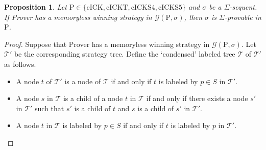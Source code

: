\documentclass{myifcolog}
\newcommand{\hickp}{\mathrm{P}}
\newcommand{\cick}{\mathrm{cICK}}
\newcommand{\cickt}{\mathrm{cICKT}}
\newcommand{\cicks}{\mathrm{cICKS4}}
\newcommand{\cickss}{\mathrm{cICKS5}}
\newtheorem{proposition}[theorem]{Proposition}
\numberwithin{theorem}{section}
\begin{document}
	\begin{proposition}\label{proposition winning strategy implies provable}
		Let $\hickp \in \{\cick, \cickt, \cicks, \cickss\}$ and $\sigma$ be a $\Sigma$-sequent. If Prover has a memoryless winning strategy in $\mathscr{G}(\hickp,\sigma)$, then $\sigma$ is $\Sigma$-provable in $\hickp$. 
	\end{proposition}
	\begin{proof}
		Suppose that Prover has a memoryless winning strategy in $\mathscr{G}(\hickp,\sigma)$. Let $\mathcal{T}'$ be the corresponding strategy tree. Define the `condensed' labeled tree $\mathcal{T}$ of $\mathcal{T'}$ as follows.
        \begin{itemize}
            \item A node $t$ of $\mathcal{T}'$ is a node of $\mathcal{T}$ if and only if $t$ is labeled by $p \in S$ in $\mathcal{T}'$.
            \item A node $s$ in $\mathcal{T}$ is a child of a node $t$ in $\mathcal{T}$ if and only if there exists a node $s'$ in $\mathcal{T}'$ such that $s'$ is a child of $t$ and $s$ is a child of $s'$ in $\mathcal{T}'$.
            \item A node $t$ in $\mathcal{T}$ is labeled by $p \in S$ if and only if $t$ is labeled by $p$ in $\mathcal{T}'$. 
        \end{itemize}

\end{proof}
\end{document}
